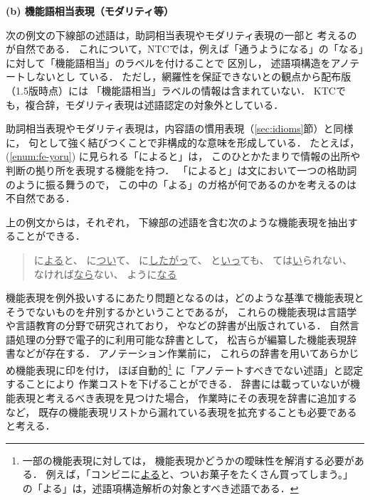 \documentclass[japanese]{jnlp_1.4}
\begin{document}
\noindent
{\bf (b) 機能語相当表現（モダリティ等）}

次の例文の下線部の述語は，助詞相当表現やモダリティ表現の一部と
考えるのが自然である．
これについて，NTCでは，例えば「通うようになる」の「なる」に対して「機能語相当」のラベルを付けることで
区別し，
述語項構造をアノテートしないとし
ている．
ただし，網羅性を保証できないとの観点から配布版（1.5版時点）には
「機能語相当」ラベルの情報は含まれていない．
KTCでも，複合辞，モダリティ表現は述語認定の対象外としている．

助詞相当表現やモダリティ表現は，内容語の慣用表現（\ref{sec:idioms}節）と同様に，
句として強く結びつくことで非構成的な意味を形成している．
たとえば，(\ref{enum:fe-yoru}) に見られる「によると」は，
このひとかたまりで情報の出所や判断の拠り所を表現する機能を持つ\cite{Morita1989}．
「によると」は文において一つの格助詞のように振る舞うので，
この中の「よる」のガ格が何であるのかを考えるのは不自然である．

上の例文からは，それぞれ，
下線部の述語を含む次のような機能表現を抽出することができる．
\begin{quote}
に\underline{よる}と、
に\underline{つい}て、
に\underline{したがっ}て、
と\underline{いっ}ても、
ては\underline{い}られない、
なければ\underline{なら}ない、
ように\underline{なる}
\end{quote}
機能表現を例外扱いするにあたり問題となるのは，どのような基準で機能表現と
そうでないものを弁別するかということであるが，
これらの機能表現は言語学や言語教育の分野で研究されており，
\cite{Morita1989}や\cite{Jamasi1998}などの辞書が出版されている．
自然言語処理の分野で電子的に利用可能な辞書として，
松吉らが編纂した機能表現辞書\cite{Matsuyoshi2007}などが存在する．
アノテーション作業前に，
これらの辞書を用いてあらかじめ機能表現に印を付け，
ほぼ自動的\footnote{
一部の機能表現に対しては，
機能表現かどうかの曖昧性を解消する必要がある．
例えば，「コンビニに\underline{よる}と、ついお菓子をたくさん買ってしまう。」
の「よる」は，述語項構造解析の対象とすべき述語である．}
に「アノテートすべきでない述語」と認定することにより
作業コストを下げることができる．
辞書には載っていないが機能表現と考えるべき表現を見つけた場合，
作業時にその表現を辞書に追加するなど，
既存の機能表現リストから漏れている表現を拡充することも必要であると考える．
\end{document}
